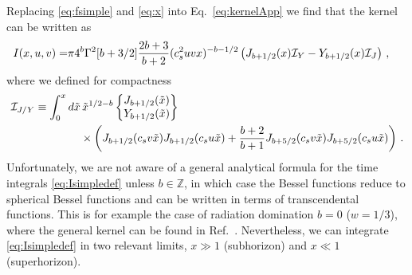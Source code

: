 \documentclass[a4paper,11pt]{article}
\numberwithin{equation}{section}
\begin{document}
Replacing \eqref{eq:fsimple} and \eqref{eq:x} into Eq.~\eqref{eq:kernelApp} we find that the kernel can be written as
\begin{align}\label{eq:Isimple}
I(x,u,v)=&\pi 4^{b}\Gamma^2[b+3/2]\frac{2b+3}{b+2}(c_s^2uvx)^{-b-1/2}\left(J_{b+1/2}(x){\cal I}_{Y}-Y_{b+1/2}(x){\cal I}_{J}\right)\,,
\end{align}
where we defined for compactness
\begin{align}\label{eq:Isimpledef}
{\cal I}_{J/Y}\equiv\int_0^xd\tilde x& \,\tilde x^{1/2-b}\begin{Bmatrix}J_{b+1/2}(\tilde x)\\ Y_{b+1/2}(\tilde x)
\end{Bmatrix}\nonumber\\&\times\left(J_{b+1/2}(c_sv\tilde x)J_{b+1/2}(c_su\tilde x)+\frac{b+2}{b+1}J_{b+5/2}(c_sv\tilde x)J_{b+5/2}(c_su\tilde x)\right)\,.
\end{align}
Unfortunately, we are not aware of a general analytical formula for the time integrals \eqref{eq:Isimpledef} unless $b\in \mathbb{Z}$, in which case the Bessel functions reduce to spherical Bessel functions and can be written in terms of transcendental functions. This is for example the case of radiation domination $b=0$ ($w=1/3$), where the general kernel can be found in Ref.~\cite{Kohri:2018awv}. Nevertheless, we can integrate \eqref{eq:Isimpledef} in two relevant limits, $x\gg1$ (subhorizon) and $x\ll1$ (superhorizon).
\end{document}

